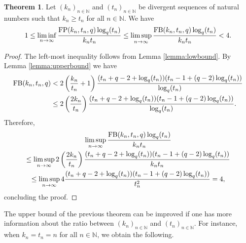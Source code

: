 \documentclass[11pt,a4paper]{article}
\theoremstyle{definition}
\newtheorem{theorem}{Theorem}[section]
\newcommand{\N}{\mathbb N}
\newcommand{\fb}{\textnormal{FB}}
\newcommand{\fp}{\textnormal{FP}}
\begin{document}

\begin{theorem}\label{theorem:main}
    Let $(k_n)_{n\in\N}$ and $(t_n)_{n\in\N}$ be divergent sequences of natural numbers such that $k_n\geq t_n$ for all $n\in\N$. We have 
    \begin{equation*}        1\leq\liminf_{n\to\infty}\frac{\fp(k_n,t_n,q)\log_q(t_n)}{k_nt_n}\leq\limsup_{n\to\infty}\frac{\fb(k_n,t_n,q)\log_q(t_n)}{k_nt_n}<4.
    \end{equation*}
\end{theorem}
\begin{proof}
 The left-most inequality follows from Lemma \ref{lemma:lowbound}. By Lemma \ref{lemma:upperbound} we have
 \begin{equation*}
     \begin{split}
         \fb(k_n,t_n,q)&< 2\left(\frac{k_n}{t_n}+1\right)\frac{(t_n+q-2+\log_q(t_n))(t_n-1+(q-2)\log_q(t_n))}{\log_q(t_n)}\\
         &\leq 2\left(\frac{2k_n}{t_n}\right)\frac{(t_n+q-2+\log_q(t_n))(t_n-1+(q-2)\log_q(t_n))}{\log_q(t_n)}.
     \end{split}
 \end{equation*}
Therefore, 
 \begin{multline*}
\limsup_{n\to\infty}\frac{\fb(k_n,t_n,q)
\log_q(t_n)}{k_nt_n} \\ \leq \limsup_{n\to\infty} 2\left(\frac{2k_n}{t_n}\right)\frac{(t_n+q-2+\log_q(t_n))(t_n-1+(q-2)\log_q(t_n))}{k_nt_n}\\
   \leq\limsup_{n\to\infty} 4\frac{(t_n+q-2+\log_q(t_n))(t_n-1+(q-2)\log_q(t_n))}{t_n^2}=4,
 \end{multline*}
 concluding the proof.
\end{proof}

The upper bound of the previous theorem can be improved if one has more information about the ratio
between $(k_n)_{n\in\N}$ and $(t_n)_{n\in\N}$. For instance, when $k_n=t_n=n$ for all $n\in\N$, we obtain the following.
\end{document}
